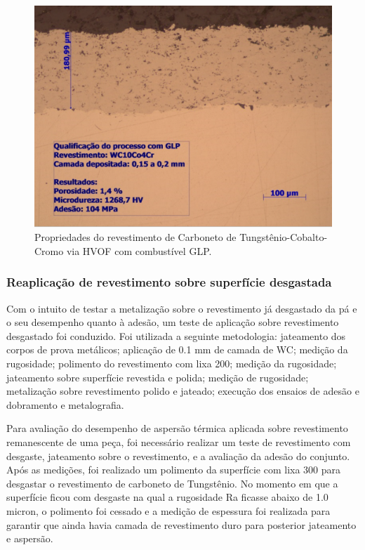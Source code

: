 \begin{figure}
	\centering
	\includegraphics[width=1\columnwidth]{method/figs/adequacao/adequacao3.png}
    \caption{Propriedades do revestimento de Carboneto de Tungstênio-Cobalto-Cromo via HVOF com combustível GLP.}
    \label{fig:adequacao3}
\end{figure}

\subsubsection{Reaplicação de revestimento sobre superfície desgastada}
Com o intuito de testar a metalização sobre o revestimento já desgastado da pá
e o seu desempenho quanto à adesão, um teste de aplicação sobre revestimento
desgastado foi conduzido. Foi utilizada a seguinte metodologia: jateamento dos
corpos de prova metálicos; aplicação de 0.1 mm de camada de WC; medição da
rugosidade; polimento do revestimento com lixa 200; medição da rugosidade; jateamento
sobre superfície revestida e polida; medição de rugosidade; metalização sobre
revestimento polido e jateado; execução dos ensaios de adesão e dobramento e
metalografia.

Para avaliação do desempenho de aspersão térmica aplicada sobre revestimento
remanescente de uma peça, foi necessário realizar um teste de revestimento com
desgaste, jateamento sobre o revestimento, e a avaliação da adesão do conjunto.
Após as medições, foi realizado um polimento da superfície com lixa 300 para
desgastar o revestimento de carboneto de Tungstênio. No momento em que a
superfície ficou com desgaste na qual a rugosidade Ra ficasse abaixo de 1.0
micron, o polimento foi cessado e a medição de espessura foi realizada para
garantir que ainda havia camada de revestimento duro para posterior jateamento
e aspersão. 

